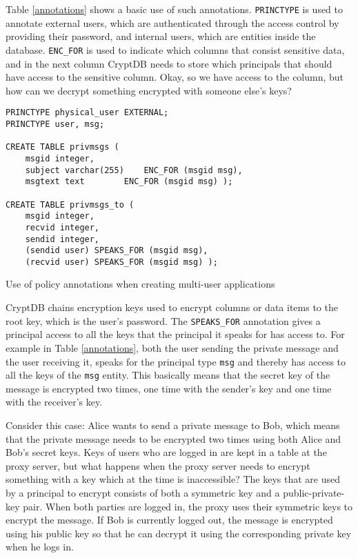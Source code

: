 Table \ref{annotations} shows a basic use of such annotations. \verb!PRINCTYPE! is used to annotate external users, which are authenticated through the access control by providing their password, and internal users, which are entities inside the database. \verb!ENC_FOR! is used to indicate which columns that consist sensitive data, and in the next column CryptDB needs to store which principals that should have access to the sensitive column. Okay, so we have access to the column, but how can we decrypt something encrypted with someone else's keys?

\begin{table}[H]
\begin{Verbatim}[frame=single]
PRINCTYPE physical_user EXTERNAL;
PRINCTYPE user, msg;

CREATE TABLE privmsgs (
	msgid integer,
	subject varchar(255)	ENC_FOR (msgid msg),
	msgtext text		ENC_FOR (msgid msg) );

CREATE TABLE privmsgs_to (
	msgid integer,
	recvid integer,
	sendid integer,
	(sendid user) SPEAKS_FOR (msgid msg),
	(recvid user) SPEAKS_FOR (msgid msg) ); 
\end{Verbatim}
\caption{Use of policy annotations when creating multi-user applications}
\label{annotations}
\end{table}

CryptDB chains encryption keys used to encrypt columns or data items to the root key, which is the user's password. The \verb!SPEAKS_FOR! annotation gives a principal access to all the keys that the principal it speaks for has access to. For example in Table \ref{annotations}, both the user sending the private message and the user receiving it, speaks for the principal type \verb!msg! and thereby has access to all the keys of the \verb!msg! entity. This basically means that the secret key of the message is encrypted two times, one time with the sender's key and one time with the receiver's key.

Consider this case: Alice wants to send a private message to Bob, which means that the private message needs to be encrypted two times using both Alice and Bob's secret keys. Keys of users who are logged in are kept in a table at the proxy server, but what happens when the proxy server needs to encrypt something with a key which at the time is inaccessible? The keys that are used by a principal to encrypt consists of both a symmetric key and a public-private-key pair. When both parties are logged in, the proxy uses their symmetric keys to encrypt the message. If Bob is currently logged out, the message is encrypted using his public key so that he can decrypt it using the corresponding private key when he logs in.


